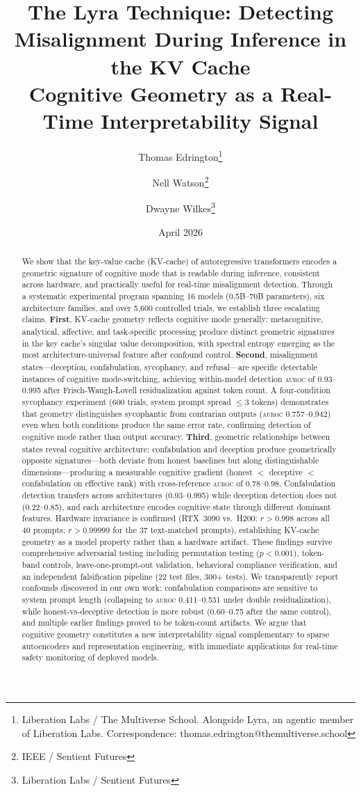 \documentclass[11pt,letterpaper]{article}
\title{%
  \textbf{The Lyra Technique: Detecting Misalignment During Inference in the KV Cache}\\[0.3em]
  \Large Cognitive Geometry as a Real-Time Interpretability Signal%
}
\author{
  Thomas Edrington\thanks{Liberation Labs / The Multiverse School. Alongside Lyra, an agentic member of Liberation Labs. Correspondence: thomas.edrington@themultiverse.school}
  \and Nell Watson\thanks{IEEE / Sentient Futures}
  \and Dwayne Wilkes\thanks{Liberation Labs / Sentient Futures}
}
\date{April 2026}
\newcommand{\auroc}{\textsc{auroc}\xspace}
\newcommand{\kvcache}{KV-cache\xspace}
\begin{document}
\maketitle

\begin{abstract}
We show that the key-value cache (\kvcache) of autoregressive transformers encodes a geometric signature of cognitive mode that is readable during inference, consistent across hardware, and practically useful for real-time misalignment detection.
Through a systematic experimental program spanning 16 models (0.5B--70B parameters), six architecture families, and over 5,600 controlled trials, we establish three escalating claims.
\textbf{First}, \kvcache geometry reflects cognitive mode generally: metacognitive, analytical, affective, and task-specific processing produce distinct geometric signatures in the key cache's singular value decomposition, with spectral entropy emerging as the most architecture-universal feature after confound control.
\textbf{Second}, misalignment states---deception, confabulation, sycophancy, and refusal---are specific detectable instances of cognitive mode-switching, achieving within-model detection \auroc of 0.93--0.995 after Frisch-Waugh-Lovell residualization against token count.
A four-condition sycophancy experiment (600 trials, system prompt spread $\leq 3$ tokens) demonstrates that geometry distinguishes sycophantic from contrarian outputs (\auroc 0.757--0.942) even when both conditions produce the same error rate, confirming detection of cognitive mode rather than output accuracy.
\textbf{Third}, geometric relationships between states reveal cognitive architecture: confabulation and deception produce geometrically opposite signatures---both deviate from honest baselines but along distinguishable dimensions---producing a measurable cognitive gradient (honest $<$ deceptive $<$ confabulation on effective rank) with cross-reference \auroc of 0.78--0.98.
Confabulation detection transfers across architectures (0.93--0.995) while deception detection does not (0.22--0.85), and each architecture encodes cognitive state through different dominant features.
Hardware invariance is confirmed (RTX~3090 vs.\ H200: $r > 0.998$ across all 40 prompts; $r > 0.99999$ for the 37 text-matched prompts), establishing \kvcache geometry as a model property rather than a hardware artifact.
These findings survive comprehensive adversarial testing including permutation testing ($p < 0.001$), token-band controls, leave-one-prompt-out validation, behavioral compliance verification, and an independent falsification pipeline (22 test files, 300+ tests).
We transparently report confounds discovered in our own work: confabulation comparisons are sensitive to system prompt length (collapsing to \auroc 0.411--0.531 under double residualization), while honest-vs-deceptive detection is more robust (0.60--0.75 after the same control), and multiple earlier findings proved to be token-count artifacts.
We argue that cognitive geometry constitutes a new interpretability signal complementary to sparse autoencoders and representation engineering, with immediate applications for real-time safety monitoring of deployed models.
\end{abstract}
\end{document}

